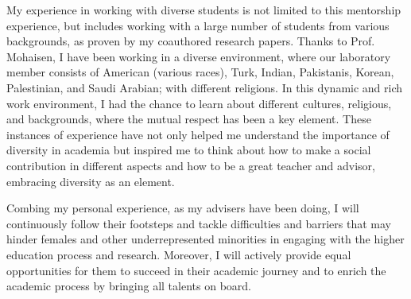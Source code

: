 \documentclass{NSF}
\begin{document}
My experience in working with diverse students is not limited to this mentorship experience, but includes working with a large number of students from various backgrounds, as proven by my coauthored research papers. Thanks to Prof. Mohaisen, I have been working in a diverse environment, where our laboratory member consists of American (various races), Turk, Indian, Pakistanis, Korean, Palestinian, and Saudi Arabian; with different religions. In this dynamic and rich work environment, I had the chance to learn about different cultures, religious, and backgrounds, where the mutual respect has been a key element.
These instances of experience have not only helped me understand the importance of diversity in academia but inspired me to think about how to make a social contribution in different aspects and how to be a great teacher and advisor, embracing diversity as an element.

Combing my personal experience, as my advisers have been doing, I will continuously follow their footsteps and tackle difficulties and barriers that may hinder females and other underrepresented minorities in engaging with the higher education process and research. Moreover,  I will actively provide equal opportunities for them to succeed in their academic journey and to enrich the academic process by bringing all talents on board. 
\end{document}

